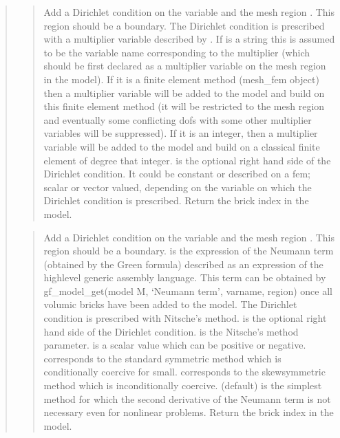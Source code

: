 \documentclass[a4paper,11pt,english]{sphinxmanual}
\begin{document}
\begin{quote}
\begin{quote}
Add a Dirichlet condition on the variable  and the mesh
region . This region should be a boundary. The Dirichlet
condition is prescribed with a multiplier variable described by
. If  is a string this is assumed
to be the variable name corresponding to the multiplier (which should be
first declared as a multiplier variable on the mesh region in the model).
If it is a finite element method (mesh\_fem object) then a multiplier
variable will be added to the model and build on this finite element
method (it will be restricted to the mesh region  and eventually
some conflicting dofs with some other multiplier variables will be
suppressed). If it is an integer, then a  multiplier variable will be
added to the model and build on a classical finite element of degree
that integer.  is the optional right hand side of  the
Dirichlet condition. It could be constant or described on a fem; scalar
or vector valued, depending on the variable on which the Dirichlet
condition is prescribed. Return the brick index in the model.
\end{quote}

\begin{quote}

Add a Dirichlet condition on the variable  and the mesh
region . This region should be a boundary. 
is the expression of the Neumann term (obtained by the Green formula)
described as an expression of the high\sphinxhyphen{}level
generic assembly language. This term can be obtained by
gf\_model\_get(model M, ‘Neumann term’, varname, region) once all volumic bricks have
been added to the model. The Dirichlet
condition is prescribed with Nitsche’s method.  is the optional
right hand side of the Dirichlet condition.  is the
Nitsche’s method parameter.  is a scalar value which can be
positive or negative.  corresponds to the standard symmetric
method which is conditionally coercive for   small.
 corresponds to the skew\sphinxhyphen{}symmetric method which is
inconditionally coercive.  (default) is the simplest method
for which the second derivative of the Neumann term is not necessary
even for nonlinear problems. Return the brick index in the model.
\end{quote}


\end{quote}
\end{document}
